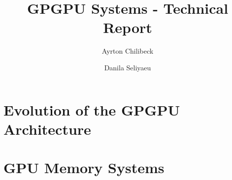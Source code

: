 



\title{GPGPU Systems - Technical Report}
\author[1]{Ayrton Chilibeck}
\author[1]{Danila Seliyaeu}



\maketitle

\vspace{2ex}

\tableofcontents

\part{Evolution of the GPGPU Architecture}







\part{GPU Memory Systems}



% 
\printbibliography


